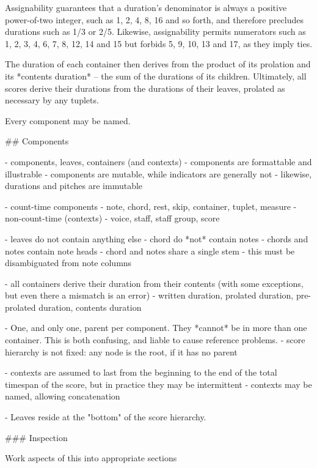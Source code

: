 Assignability guarantees that a duration's denominator is always a positive
power-of-two integer, such as 1, 2, 4, 8, 16 and so forth, and therefore
precludes durations such as 1/3 or 2/5. Likewise, assignability permits
numerators such as 1, 2, 3, 4, 6, 7, 8, 12, 14 and 15 but forbids 5, 9, 10, 13
and 17, as they imply ties.

\begin{markdown}

The duration of each container then derives from the product of its prolation
and its *contents duration* -- the sum of the durations of its children.
Ultimately, all scores derive their durations from the durations of their
leaves, prolated as necessary by any tuplets.

Every component may be named.

## Components

-   components, leaves, containers (and contexts)
-   components are formattable and illustrable 
-   components are mutable, while indicators are generally not
    -   likewise, durations and pitches are immutable
    
-   count-time components
    -   note, chord, rest, skip, container, tuplet, measure
-   non-count-time (contexts)
    -   voice, staff, staff group, score

-   leaves do not contain anything else
    -   chord do *not* contain notes
    -   chords and notes contain note heads
    -   chord and notes share a single stem
    -   this must be disambiguated from note columns

-   all containers derive their duration from their contents (with some
    exceptions, but even there a mismatch is an error)
-   written duration, prolated duration, pre-prolated duration, contents
    duration

-   One, and only one, parent per component. They *cannot* be in more than one
    container. This is both confusing, and liable to cause reference problems.
-   score hierarchy is not fixed: any node is the root, if it has no parent

-   contexts are assumed to last from the beginning to the end of the total
    timespan of the score, but in practice they may be intermittent
-   contexts may be named, allowing concatenation

-   Leaves reside at the "bottom" of the score hierarchy.

### Inspection

Work aspects of this into appropriate sections


\end{markdown}
